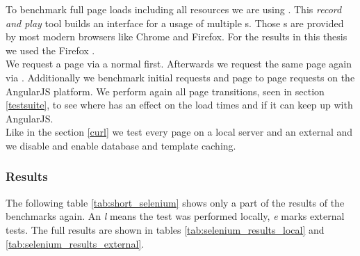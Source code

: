 To benchmark full page loads including all resources we are using \selenium{}.
This \emph{record and play} tool builds an interface for a usage of multiple \webdriver{}s.
Those \webdriver{}s are provided by most modern browsers like Chrome and Firefox.
For the results in this thesis we used the Firefox \webdriver{}.
\\
We request a page via a normal \httpRequest{} first.
Afterwards we request the same page again via \lare{}.
Additionally we benchmark initial requests and page to page requests on the AngularJS platform.
We perform again all page transitions, seen in section \ref{testsuite}, to see where \lare{} has an effect on the load times and if it can keep up with AngularJS.
\\
Like in the section \ref{curl} we test every page on a local server and an external \webServer{} and we disable and enable database and template caching.

\subsubsection{Results}
The following table \ref{tab:short_selenium} shows only a part of the results of the \selenium{} benchmarks again. 
An \emph{l} means the test was performed locally, \emph{e} marks external tests.
The full results are shown in tables \ref{tab:selenium_results_local} and \ref{tab:selenium_results_external}.

